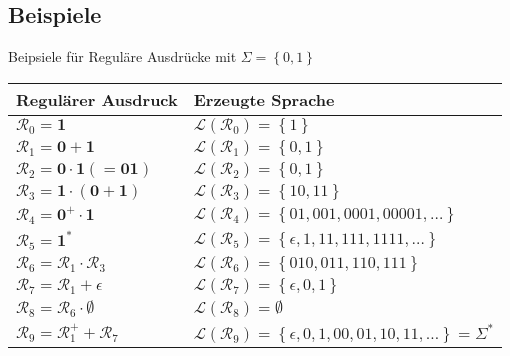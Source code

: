\documentclass[]{beamer}
\begin{document}
\subsection{Beispiele}
\begin{frame}[<+->][squeeze]{}
\begin{exampleblock}{Beipsiele für Reguläre Ausdrücke mit $\Sigma = \left\{ 0, 1 \right\}$}
\begin{table}
  \centering
  \vspace*{0.5em}
  \begin{tabular}{|l|l|}
    \hline
    Regulärer Ausdruck & Erzeugte Sprache \\
    \hline
    \hline
    $\mathcal{R}_0 = \textbf{1}$ & $\mathcal{L} \left( \mathcal{R}_0 \right) = \left\{ 1 \right\}$ \\
    \hline
    $\mathcal{R}_1 = \textbf{0} + \textbf{1}$ & $\mathcal{L} \left( \mathcal{R}_1 \right) = \left\{ 0, 1 \right\}$ \\
    \hline
    $\mathcal{R}_2 = \textbf{0} \cdot \textbf{1} \left( = \textbf{01} \right)$ & $\mathcal{L} \left( \mathcal{R}_2 \right) = \left\{ 0, 1 \right\}$ \\
    \hline
    $\mathcal{R}_3 = \textbf{1} \cdot \left( \textbf{0} + \textbf{1} \right)$ & $\mathcal{L} \left( \mathcal{R}_3 \right) = \left\{ 10, 11 \right\}$ \\
    \hline
    $\mathcal{R}_4 = \textbf{0}^+ \cdot \textbf{1}$ & $\mathcal{L} \left( \mathcal{R}_4 \right) = \left\{ 01, 001, 0001, 00001, \ldots \right\}$ \\
    \hline
    $\mathcal{R}_5 = \textbf{1}^*$ & $\mathcal{L} \left( \mathcal{R}_5 \right) = \left\{ \epsilon, 1, 11, 111, 1111, \ldots \right\}$ \\
    \hline
    $\mathcal{R}_6 = \mathcal{R}_1 \cdot \mathcal{R}_3$ & $\mathcal{L} \left( \mathcal{R}_6 \right) = \left\{ 010, 011, 110, 111 \right\}$ \\
    \hline
    $\mathcal{R}_7 = \mathcal{R}_1 + \epsilon$ & $\mathcal{L} \left( \mathcal{R}_7 \right) = \left\{ \epsilon, 0, 1 \right\}$ \\
    \hline
    $\mathcal{R}_8 = \mathcal{R}_6 \cdot \emptyset$ & $\mathcal{L} \left( \mathcal{R}_8 \right) = \emptyset$ \\
    \hline
    $\mathcal{R}_9 = \mathcal{R}_1^+ + \mathcal{R}_7$ & $\mathcal{L} \left( \mathcal{R}_9 \right) = \left\{ \epsilon, 0, 1, 00, 01, 10, 11, \ldots \right\} = \Sigma^*$ \\
    \hline    
  \end{tabular}
  \vspace*{-0.5em}
\end{table}
\end{exampleblock}
\end{frame}
\end{document}
